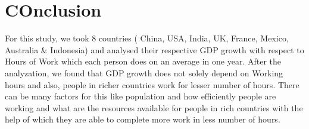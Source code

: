 \documentclass[11pt,a4paper,]{article}
\begin{document}
\hypertarget{conclusion}{%
\section{COnclusion}\label{conclusion}}

For this study, we took 8 countries ( China, USA, India, UK, France, Mexico, Australia \& Indonesia) and analysed their respective GDP growth with respect to Hours of Work which each person does on an average in one year. After the analyzation, we found that GDP growth does not solely depend on Working hours and also, people in richer countries work for lesser number of hours. There can be many factors for this like population and how efficiently people are working and what are the resources available for people in rich countries with the help of which they are able to complete more work in less number of hours.

\printbibliography[title=References]
\end{document}
